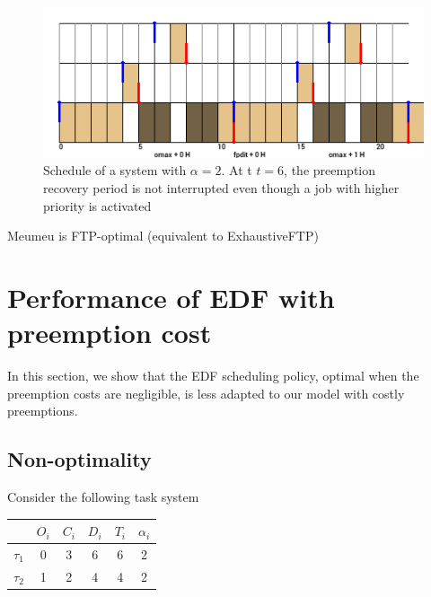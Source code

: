 \documentclass[a4paper,10pt]{article}
\begin{document}
        \begin{figure}[h]
        \begin{center}
            \includegraphics[width=\textwidth]{figs/atomicpreemption_example.png}
            \caption{Schedule of a system with $\alpha=2$. At t $t=6$, the preemption recovery period is not interrupted even though a job with higher priority is activated}
            \label{fig:prp}
        \end{center}
        \end{figure}

        Meumeu is FTP-optimal (equivalent to ExhaustiveFTP)

\section{Performance of EDF with preemption cost}

    In this section, we show that the EDF scheduling policy, optimal when the preemption costs are negligible, is less adapted to our model with costly preemptions.

    \subsection{Non-optimality}

        Consider the following task system

        \begin{center}
            \begin{tabular}{|r|c|c|c|c|c|}
                \hline
                            & $O_i$ & $C_i$ & $D_i$ & $T_i$ & $\alpha_i$ \\ \hline
                $\tau_1$    & 0     & 3     & 6    & 6     & 2     \\ \hline
                $\tau_2$    & 1     & 2     & 4    & 4     & 2     \\ \hline
            \end{tabular}
        \end{center}
\end{document}
